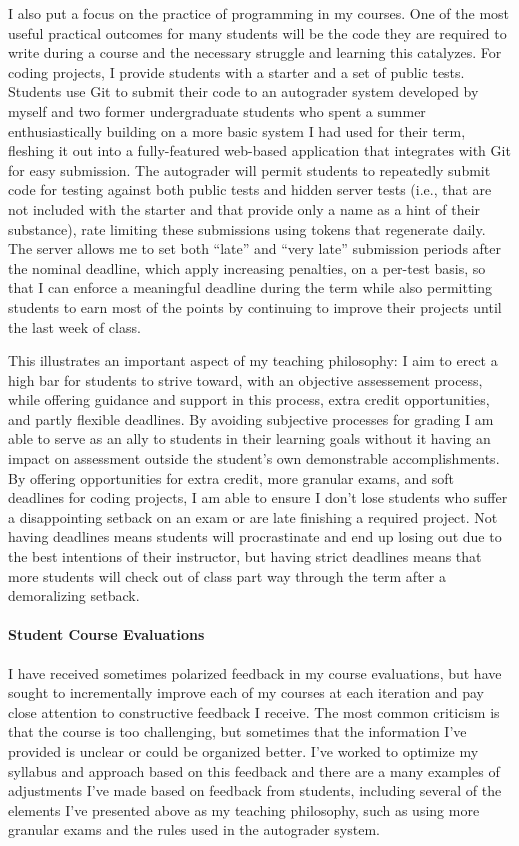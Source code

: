 \documentclass[12pt]{article}
\begin{document}
I also put a focus on the practice of programming in my courses. One of the most useful practical outcomes for many students will be the code they are required to write during a course and the necessary struggle and learning this catalyzes.
For coding projects, I provide students with a starter and a set of public tests. Students use Git to submit their code to an autograder system developed by myself and two former undergraduate students who spent a summer enthusiastically building on a more basic system I had used for their term, fleshing it out into a fully-featured web-based application that integrates with Git for easy submission. The autograder will permit students to repeatedly submit code for testing against both public tests and hidden server tests (i.e., that are not included with the starter and that provide only a name as a hint of their substance), rate limiting these submissions using tokens that regenerate daily. The server allows me to set both ``late'' and ``very late'' submission periods after the nominal deadline, which apply increasing penalties, on a per-test basis, so that I can enforce a meaningful deadline during the term while also permitting students to earn most of the points by continuing to improve their projects until the last week of class.

This illustrates an important aspect of my teaching philosophy: I aim to erect a high bar for students to strive toward, with an objective assessement process, while offering guidance and support in this process, extra credit opportunities, and partly flexible deadlines. By avoiding subjective processes for grading I am able to serve as an ally to students in their learning goals without it having an impact on assessment outside the student's own demonstrable accomplishments. By offering opportunities for extra credit, more granular exams, and soft deadlines for coding projects, I am able to ensure I don't lose students who suffer a disappointing setback on an exam or are late finishing a required project. Not having deadlines means students will procrastinate and end up losing out due to the best intentions of their instructor, but having strict deadlines means that more students will check out of class part way through the term after a demoralizing setback.

\paragraph{Student Course Evaluations}

I have received sometimes polarized feedback in my course evaluations, but have sought to incrementally improve each of my courses at each iteration and pay close attention to constructive feedback I receive. The most common criticism is that the course is too challenging, but sometimes that the information I've provided is unclear or could be organized better. I've worked to optimize my syllabus and approach based on this feedback and there are a many examples of adjustments I've made based on feedback from students, including several of the elements I've presented above as my teaching philosophy, such as using more granular exams and the rules used in the autograder system.
\end{document}
